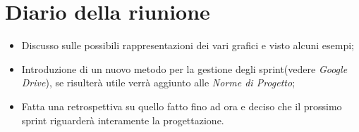 \section{Diario della riunione}
\begin{itemize}
  \item Discusso sulle possibili rappresentazioni dei vari grafici e visto alcuni esempi;
  \item Introduzione di un nuovo metodo per la gestione degli sprint(vedere \textit{Google Drive}), se risulterà utile verrà aggiunto alle \textit{Norme di Progetto};
  \item Fatta una retrospettiva su quello fatto fino ad ora e deciso che il prossimo sprint riguarderà interamente la progettazione.
\end{itemize}
